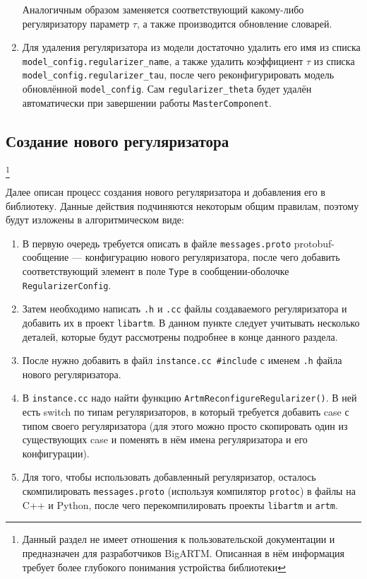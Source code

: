 \begin{enumerate}
	Аналогичным образом заменяется соответствующий какому-либо регуляризатору параметр $\tau$, а также производится обновление словарей.
	
	\item Для удаления регуляризатора из модели достаточно удалить его имя из списка \verb|model_config.regularizer_name|, а также удалить коэффициент $\tau$ из списка \verb|model_config.regularizer_tau|, после чего реконфигурировать модель обновлённой \verb|model_config|. Сам \verb|regularizer_theta| будет удалён автоматически при завершении работы \verb|MasterComponent|.
	
\end{enumerate}

\subsection{Создание нового регуляризатора}
\footnote{Данный раздел не имеет отношения к пользовательской документации и предназначен для разработчиков BigARTM. Описанная в нём информация требует более глубокого понимания устройства библиотеки}

Далее описан процесс создания нового регуляризатора и добавления его в библиотеку. Данные действия подчиняются некоторым общим правилам, поэтому будут изложены в алгоритмическом виде:

\begin{enumerate}
	\item В первую очередь требуется описать в файле \verb'messages.proto' protobuf-сообщение ---  конфигурацию нового регуляризатора, после чего добавить соответствующий элемент в поле \verb'Type' в сообщении-оболочке \verb'RegularizerConfig'.
	
	\item Затем необходимо написать \verb'.h' и \verb'.cc' файлы создаваемого регуляризатора и добавить их в проект \verb'libartm'. В данном пункте следует учитывать несколько деталей, которые будут рассмотрены подробнее в конце данного раздела.
	
	\item После нужно добавить в файл \verb'instance.cc #include' с именем \verb'.h' файла нового регуляризатора.
	
	\item В  \verb'instance.cc' надо найти функцию \verb'ArtmReconfigureRegularizer()'. В ней есть switch по типам регуляризаторов, в который требуется добавить case с типом своего регуляризатора (для этого можно просто скопировать один из существующих case и поменять в нём имена регуляризатора и его конфигурации).
	
	\item Для того, чтобы использовать добавленный регуляризатор, осталось скомпилировать \verb'messages.proto' (используя компилятор \verb'protoc') в файлы на C++ и Python, после чего перекомпилировать проекты \verb'libartm' и \verb'artm'.
\end{enumerate}

